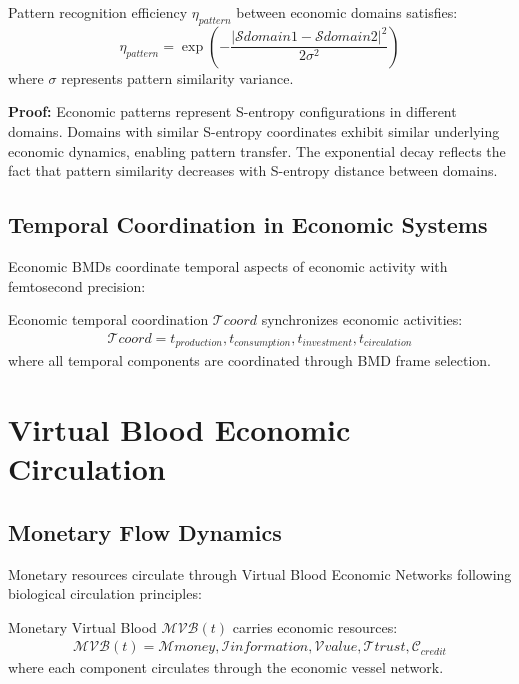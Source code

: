 \begin{theorem}
Pattern recognition efficiency $\eta_{pattern}$ between economic domains satisfies:
\begin{equation}
\eta_{pattern} = \exp\left(-\frac{|\mathcal{S}{domain1} - \mathcal{S}{domain2}|^2}{2\sigma^2}\right)
\end{equation}
where $\sigma$ represents pattern similarity variance.

\textbf{Proof:}
Economic patterns represent S-entropy configurations in different domains. Domains with similar S-entropy coordinates exhibit similar underlying economic dynamics, enabling pattern transfer. The exponential decay reflects the fact that pattern similarity decreases with S-entropy distance between domains.
\end{theorem}

\subsection{Temporal Coordination in Economic Systems}

Economic BMDs coordinate temporal aspects of economic activity with femtosecond precision:

\begin{definition}
Economic temporal coordination $\mathcal{T}{coord}$ synchronizes economic activities:
\begin{align}
\mathcal{T}{coord} = {t_{production}, t_{consumption}, t_{investment}, t_{circulation}}
\end{align}
where all temporal components are coordinated through BMD frame selection.
\end{definition}

\section{Virtual Blood Economic Circulation}

\subsection{Monetary Flow Dynamics}

Monetary resources circulate through Virtual Blood Economic Networks following biological circulation principles:

\begin{definition}
Monetary Virtual Blood $\mathcal{MVB}(t)$ carries economic resources:
\begin{align}
\mathcal{MVB}(t) = {\mathcal{M}{money}, \mathcal{I}{information}, \mathcal{V}{value}, \mathcal{T}{trust}, \mathcal{C}_{credit}}
\end{align}
where each component circulates through the economic vessel network.
\end{definition}

